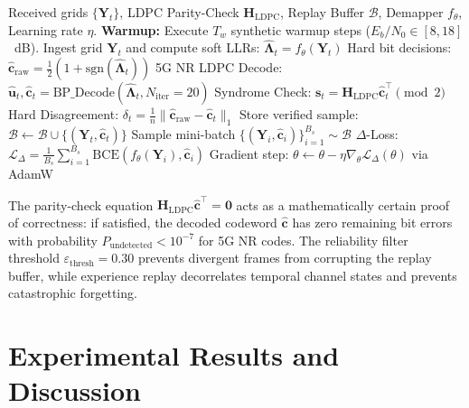 ﻿\documentclass[journal,twoside]{IEEEtran}
\begin{document}
\begin{algorithm}[t]
\caption{Online Self-Supervised $\Delta$-Loop with Experience Replay}
\label{alg:delta_loop}
\small
\begin{algorithmic}[1]
\REQUIRE Received grids $\{\mathbf{Y}_t\}$, LDPC Parity-Check $\mathbf{H}_{\text{LDPC}}$, Replay Buffer $\mathcal{B}$, Demapper $f_\theta$, Learning rate $\eta$.
\STATE \textbf{Warmup:} Execute $T_w$ synthetic warmup steps ($E_b/N_0 \in [8, 18]$~dB).
    \STATE Ingest grid $\mathbf{Y}_t$ and compute soft LLRs: $\hat{\bm{\Lambda}}_t = f_\theta(\mathbf{Y}_t)$
    \STATE Hard bit decisions: $\hat{\mathbf{c}}_{\text{raw}} = \frac{1}{2}(1 + \text{sgn}(\hat{\bm{\Lambda}}_t))$
    \STATE 5G NR LDPC Decode: $\hat{\mathbf{u}}_t, \hat{\mathbf{c}}_t = \text{BP\_Decode}(\hat{\bm{\Lambda}}_t, N_{\text{iter}}=20)$
    \STATE Syndrome Check: $\mathbf{s}_t = \mathbf{H}_{\text{LDPC}} \hat{\mathbf{c}}_t^\top \pmod 2$
    \STATE Hard Disagreement: $\delta_t = \frac{1}{n} \|\hat{\mathbf{c}}_{\text{raw}} - \hat{\mathbf{c}}_t\|_1$
        \STATE Store verified sample: $\mathcal{B} \leftarrow \mathcal{B} \cup \{(\mathbf{Y}_t, \hat{\mathbf{c}}_t)\}$
    \ENDIF
        \STATE Sample mini-batch $\{(\mathbf{Y}_i, \hat{\mathbf{c}}_i)\}_{i=1}^{B_s} \sim \mathcal{B}$
        \STATE $\Delta$-Loss: $\mathcal{L}_\Delta = \frac{1}{B_s} \sum_{i=1}^{B_s} \text{BCE}(f_\theta(\mathbf{Y}_i), \hat{\mathbf{c}}_i)$
        \STATE Gradient step: $\theta \leftarrow \theta - \eta \nabla_\theta \mathcal{L}_\Delta(\theta)$ via AdamW
    \ENDIF
\ENDFOR
\end{algorithmic}
\end{algorithm}

The parity-check equation $\mathbf{H}_{\text{LDPC}}\hat{\mathbf{c}}^\top = \mathbf{0}$ acts as a
mathematically certain proof of correctness: if satisfied, the decoded codeword $\hat{\mathbf{c}}$
has zero remaining bit errors with probability $P_{\text{undetected}} < 10^{-7}$ for 5G NR codes.
The reliability filter threshold $\varepsilon_{\text{thresh}} = 0.30$ prevents divergent frames
from corrupting the replay buffer, while experience replay decorrelates temporal channel states
and prevents catastrophic forgetting.

\section{Experimental Results and Discussion}\label{sec:results}
\end{document}
